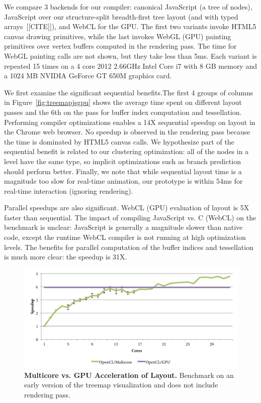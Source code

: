 We compare 3 backends for our compiler: canonical JavaScript (a tree of nodes), JavaScript over our structure-split breadth-first tree layout (and with typed arrays~[[CITE]]), and WebCL for the GPU.  The first two variants invoke HTML5 canvas drawing primitives, while the last invokes WebGL (GPU) painting primitives over vertex buffers computed in the rendering pass. The time for WebGL painting calls are not shown, but they take less than 5ms. Each variant is repeated 15 times on a 4 core 2012 2.66GHz Intel Core i7 with 8 GB memory and a 1024 MB NVIDIA GeForce GT 650M graphics card.

We first examine  the significant sequential benefits.The first 4 groups of columns in Figure~\ref{fig:treemapjsgpu} shows the average time spent on different layout passes and the 6th on the pass for buffer index computation and tessellation. Performing compiler optimizations enables a 14X sequential speedup on layout in the Chrome web browser. No speedup is observed in the rendering pass because the time is dominated by HTML5 canvas calls. We hypothesize part of the sequential benefit is related to our clustering optimization: all of the nodes in a level have the same type, so implicit optimizations such as branch prediction should perform better. Finally, we note that while sequential layout time is a magnitude too slow for real-time animation, our prototype is within 54ms for real-time interaction (ignoring rendering).

Parallel speedups are also significant. WebCL (GPU) evaluation of layout is 5X faster than sequential. The impact of compiling JavaScript vs. C (WebCL) on the benchmark is unclear: JavaScript is generally a magnitude slower than native code, except the runtime WebCL compiler is not running at high optimization levels. The benefits for parallel computation of the buffer indices and tessellation is much more clear: the speedup is 31X. 

\begin{figure}
\centering
\includegraphics[trim=0 0 0 0,clip,width=1.0\columnwidth]{chapter6/gpuvscpu}
\caption{\textbf{Multicore vs. GPU Acceleration of Layout.} Benchmark on an early version of the treemap visualization and does not include rendering pass.}
\label{fig:cpuvsgpu}
\end{figure}

